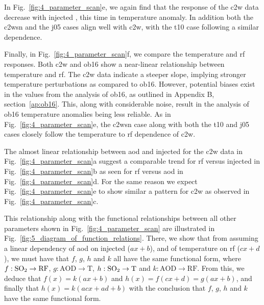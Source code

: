 \documentclass{ametsocV6.1}
\newcommand{\iso}[1][i]{{#1}njected \ce{SO2}}
\begin{document}
In Fig.~\ref{fig:4_parameter_scan}e, we again find that the response of the \gls{c2w}
data decrease with \iso{}, this time in temperature anomaly. In addition both the
\gls{c2wsn} and the \gls{j05} cases align well with \gls{c2w}, with the \gls{t10} case
following a similar dependence.

Finally, in Fig.~\ref{fig:4_parameter_scan}f, we compare the temperature and \gls{rf}
responses. Both \gls{c2w} and \gls{ob16} show a near-linear relationship between
temperature and \gls{rf}. The \gls{c2w} data indicate a steeper slope, implying stronger
temperature perturbations as compared to \gls{ob16}. However, potential biases exist in
the values from the analysis of \gls{ob16}, as outlined in Appendix B,
section~\ref{ap:ob16}. This, along with considerable noise, result in the analysis of
\gls{ob16} temperature anomalies being less reliable. As in
Fig.~\ref{fig:4_parameter_scan}e, the \gls{c2wsn} case along with both the \gls{t10} and
\gls{j05} cases closely follow the temperature to \gls{rf} dependence of \gls{c2w}.

The almost linear relationship between \gls{aod} and \iso{} for the \gls{c2w} data in
Fig.~\ref{fig:4_parameter_scan}a suggest a comparable trend for \gls{rf} versus \iso{}
in Fig.~\ref{fig:4_parameter_scan}b as seen for \gls{rf} versus \gls{aod} in
Fig.~\ref{fig:4_parameter_scan}d. For the same reason we expect
Fig.~\ref{fig:4_parameter_scan}e to show similar a pattern for \gls{c2w} as observed in
Fig.~\ref{fig:4_parameter_scan}c.

This relationship along with the functional relationships between all other parameters
shown in Fig.~\ref{fig:4_parameter_scan} are illustrated in
Fig.~\ref{fig:5_diagram_of_function_relations}. There, we show that from assuming a
linear dependency of \gls{aod} on \iso{} (\(ax+b\)), and of temperature on \gls{rf}
(\(cx+d\)), we must have that \(f\), \(g\), \(h\) and \(k\) all have the same functional
form, where \(f: \ce{SO2} \to \mathrm{RF}\), \(g: \mathrm{AOD} \to \mathrm{T}\), \(h:
\ce{SO2} \to \mathrm{T}\) and \(k: \mathrm{AOD} \to \mathrm{RF}\). From this, we deduce
that \(f(x)=k(ax+b)\) and \(h(x)=f(cx+d)=g(ax+b)\), and finally that
\(h(x)=k(acx+ad+b)\) with the conclusion that \(f\), \(g\), \(h\) and \(k\) have the
same functional form.
\end{document}
